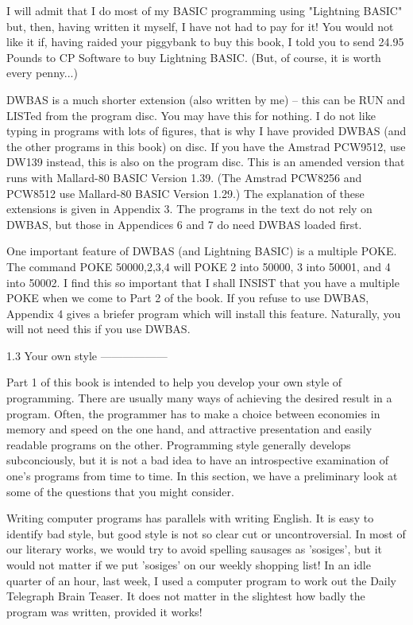 I  will admit that I do most of my BASIC programming using  "Lightning  BASIC" 
but,  then, having written it myself, I have not had to pay for it! You  would 
not  like it if, having raided your piggybank to buy this book, I told you  to 
send  24.95 Pounds to CP Software to buy Lightning BASIC. (But, of course,  it 
is worth every penny...)

DWBAS is a much shorter extension (also written by me) -- this can be RUN  and 
LISTed  from  the program disc. You may have this for nothing. I do  not  like 
typing  in  programs with lots of figures, that is why I have  provided  DWBAS 
(and  the  other  programs  in this book) on disc. If  you  have  the  Amstrad 
PCW9512,  use  DW139  instead, this is also on the program disc.  This  is  an 
amended  version  that runs with Mallard-80 BASIC Version 1.39.  (The  Amstrad 
PCW8256  and  PCW8512 use Mallard-80 BASIC Version 1.29.) The  explanation  of 
these extensions is given in Appendix 3. The programs in the text do not  rely 
on DWBAS, but those in Appendices 6 and 7 do need DWBAS loaded first.

One  important feature of DWBAS (and Lightning BASIC) is a multiple POKE.  The 
command  POKE  50000,2,3,4 will POKE 2 into 50000, 3 into 50001,  and  4  into 
50002.  I find this so important that I shall INSIST that you have a  multiple 
POKE when we come to Part 2 of the book. If you refuse to use DWBAS,  Appendix 
4 gives a briefer program which will install this feature. Naturally, you will 
not need this if you use DWBAS.


1.3 Your own style
------------------

Part  1  of  this  book is intended to help you  develop  your  own  style  of 
programming. There are usually many ways of achieving the desired result in  a 
program.  Often,  the  programmer has to make a choice  between  economies  in 
memory  and  speed  on the one hand, and attractive  presentation  and  easily 
readable   programs  on  the  other.  Programming  style  generally   develops 
subconciously,  but it is not a bad idea to have an introspective  examination 
of  one's programs from time to time. In this section, we have  a  preliminary 
look at some of the questions that you might consider.

Writing  computer programs has parallels with writing English. It is  easy  to 
identify bad style, but good style is not so clear cut or uncontroversial.  In 
most  of  our  literary  works, we would try to  avoid  spelling  sausages  as 
'sosiges', but it would not matter if we put 'sosiges' on our weekly  shopping 
list!  In an idle quarter of an hour, last week, I used a computer program  to 
work out the Daily Telegraph Brain Teaser. It does not matter in the slightest 
how badly the program was written, provided it works!

